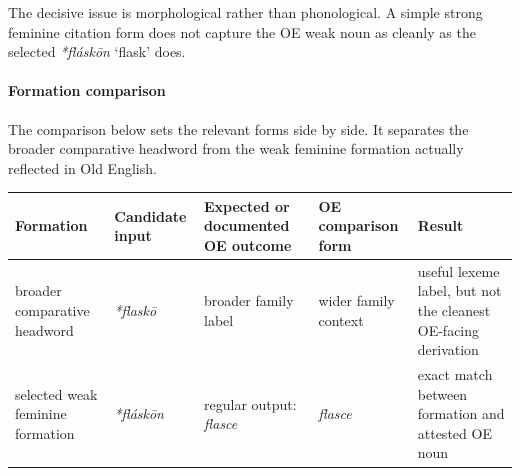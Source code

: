 \documentclass[
  british,
  a4paper,
]{article}
\newcounter{none} %
\providecommand{\Recon}[1]{\emph{*#1}}
\begin{document}
The decisive issue is morphological rather than phonological. A simple
strong feminine citation form does not capture the OE weak noun as
cleanly as the selected \Recon{fláskōn} `flask' does.

\paragraph{Formation comparison}\label{formation-comparison-2}

The comparison below sets the relevant forms side by side. It separates
the broader comparative headword from the weak feminine formation
actually reflected in Old English.

{\def\LTcaptype{none} %
\begin{longtable}[]{@{}
  >{\raggedright\arraybackslash}p{}
  >{\raggedright\arraybackslash}p{}
  >{\raggedright\arraybackslash}p{}
  >{\raggedright\arraybackslash}p{}
  >{\raggedright\arraybackslash}p{}@{}}
\toprule\noalign{}
\begin{minipage}[b]{\linewidth}\raggedright
Formation
\end{minipage} & \begin{minipage}[b]{\linewidth}\raggedright
Candidate input
\end{minipage} & \begin{minipage}[b]{\linewidth}\raggedright
Expected or documented OE outcome
\end{minipage} & \begin{minipage}[b]{\linewidth}\raggedright
OE comparison form
\end{minipage} & \begin{minipage}[b]{\linewidth}\raggedright
Result
\end{minipage} \\
\midrule\noalign{}
\endhead
\bottomrule\noalign{}
\endlastfoot
broader comparative headword & {\emph{*flaskō}} & broader family label &
wider family context & useful lexeme label, but not the cleanest
OE-facing derivation \\
selected weak feminine formation & {\emph{*fláskōn}} & regular output:
{\emph{flasce}} & {\emph{flasce}} & exact match between formation and
attested OE noun \\
\end{longtable}
}
\end{document}
